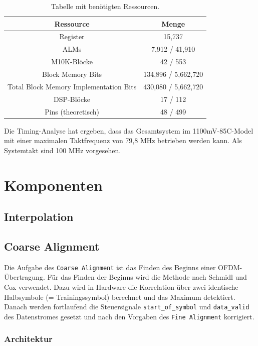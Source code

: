 \begin{table}[H]
\centering
\begin{tabular}{|c|c|}
\hline
\textbf{Ressource} & \textbf{Menge} \\ \hline
Register & 15,737 \\ \hline
ALMs & 7,912 / 41,910 \\ \hline
M10K-Blöcke & 42 / 553 \\ \hline
Block Memory Bits & 134,896 / 5,662,720 \\ \hline
Total Block Memory Implementation Bits & 430,080 / 5,662,720 \\ \hline
DSP-Blöcke & 17 / 112 \\ \hline
Pins (theoretisch) & 48 / 499 \\ \hline
\end{tabular}
\caption{Tabelle mit benötigten Ressourcen.}
\label{tab:resources_coarse}
\end{table}

Die Timing-Analyse hat ergeben, dass das Gesamtsystem im 1100mV-85C-Model mit einer maximalen Taktfrequenz von 79,8 MHz betrieben werden kann. Als Systemtakt sind 100 MHz vorgesehen.

\section{Komponenten}

\subsection{Interpolation}

\subsection{Coarse Alignment}
Die Aufgabe des \texttt{Coarse Alignment} ist das Finden des Beginns einer OFDM-Übertragung. Für das Finden der Beginns wird die Methode nach Schmidl und Cox verwendet. Dazu wird in Hardware die Korrelation über zwei identische Halbsymbole (= Trainingssymbol) berechnet und das Maximum detektiert. Danach werden fortlaufend die Steuersignale \texttt{start\_of\_symbol} und \texttt{data\_valid} des Datenstromes gesetzt und nach den Vorgaben des \texttt{Fine Alignment} korrigiert.

\subsubsection{Architektur}

